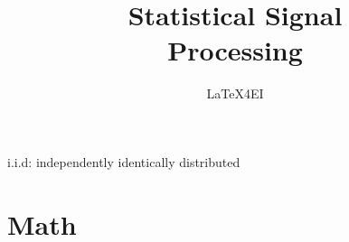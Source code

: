 \documentclass[english]{latex4ei/latex4ei_sheet}
\title{Statistical Signal\\ Processing}
\author{LaTeX4EI}					%
\begin{document}
\ifdefined\GitRevision{}\fi
\maketitle   %

\begin{symbolbox}
i.i.d: independently identically distributed
\end{symbolbox}

\section{Math}
\end{document}
